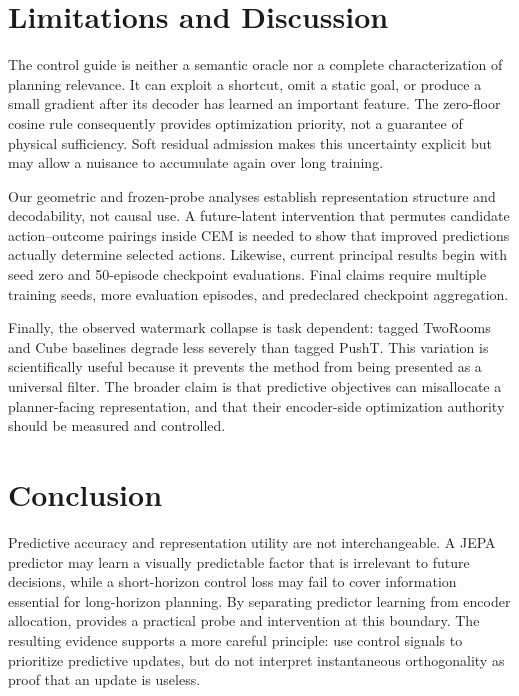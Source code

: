 \section{Limitations and Discussion}

The control guide is neither a semantic oracle nor a complete characterization
of planning relevance.  It can exploit a shortcut, omit a static goal, or
produce a small gradient after its decoder has learned an important feature.
The zero-floor cosine rule consequently provides optimization priority, not a guarantee of
physical sufficiency.  Soft residual admission makes this uncertainty explicit
but may allow a nuisance to accumulate again over long training.

Our geometric and frozen-probe analyses establish representation structure and
decodability, not causal use.  A future-latent intervention that permutes
candidate action--outcome pairings inside CEM is needed to show that improved
predictions actually determine selected actions.  Likewise, current principal
results begin with seed zero and 50-episode checkpoint evaluations.  Final
claims require multiple training seeds, more evaluation episodes, and
predeclared checkpoint aggregation.

Finally, the observed watermark collapse is task dependent: tagged TwoRooms
and Cube baselines degrade less severely than tagged PushT.  This variation is
scientifically useful because it prevents the method from being presented as a
universal filter.  The broader claim is that predictive objectives can
misallocate a planner-facing representation, and that their encoder-side
optimization authority should be measured and controlled.

\section{Conclusion}

Predictive accuracy and representation utility are not interchangeable.  A
JEPA predictor may learn a visually predictable factor that is irrelevant to
future decisions, while a short-horizon control loss may fail to cover
information essential for long-horizon planning.  By separating predictor
learning from encoder allocation, \shortmethod{} provides a practical probe
and intervention at this boundary.  The resulting evidence supports a more
careful principle: use control signals to prioritize predictive updates, but
do not interpret instantaneous orthogonality as proof that an update is
useless.
